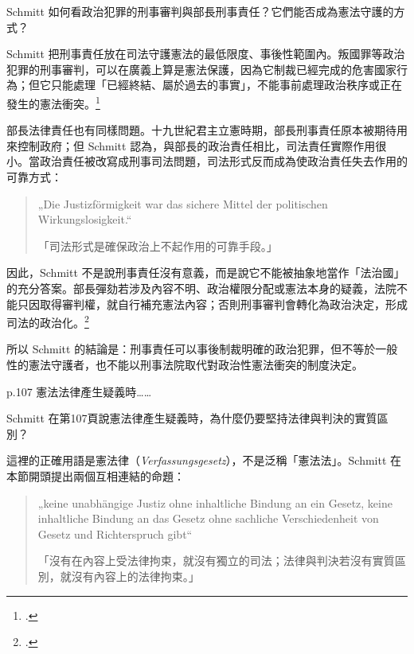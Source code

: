 \begin{qaquestion}
Schmitt 如何看政治犯罪的刑事審判與部長刑事責任？它們能否成為憲法守護的方式？
\end{qaquestion}

Schmitt 把刑事責任放在司法守護憲法的最低限度、事後性範圍內。叛國罪等政治犯罪的刑事審判，可以在廣義上算是憲法保護，因為它制裁已經完成的危害國家行為；但它只能處理「已經終結、屬於過去的事實」，不能事前處理政治秩序或正在發生的憲法衝突。\footcites[95--96]{schmitt2015}[26--27]{schmitt1931}

部長法律責任也有同樣問題。十九世紀君主立憲時期，部長刑事責任原本被期待用來控制政府；但 Schmitt 認為，與部長的政治責任相比，司法責任實際作用很小。當政治責任被改寫成刑事司法問題，司法形式反而成為使政治責任失去作用的可靠方式：

\begin{quote}
„Die Justizförmigkeit war das sichere Mittel der politischen Wirkungslosigkeit.``

「司法形式是確保政治上不起作用的可靠手段。」
\end{quote}

因此，Schmitt 不是說刑事責任沒有意義，而是說它不能被抽象地當作「法治國」的充分答案。部長彈劾若涉及內容不明、政治權限分配或憲法本身的疑義，法院不能只因取得審判權，就自行補充憲法內容；否則刑事審判會轉化為政治決定，形成司法的政治化。\footcites[90--93, 96--99]{schmitt2015}[22--29]{schmitt1931}

所以 Schmitt 的結論是：刑事責任可以事後制裁明確的政治犯罪，但不等於一般性的憲法守護者，也不能以刑事法院取代對政治性憲法衝突的制度決定。


\begin{qaprompt}
p.107 憲法法律產生疑義時\ldots\ldots{}
\end{qaprompt}

\begin{qaquestion}
Schmitt 在第107頁說憲法律產生疑義時，為什麼仍要堅持法律與判決的實質區別？
\end{qaquestion}

這裡的正確用語是憲法律（\emph{Verfassungsgesetz}），不是泛稱「憲法法」。Schmitt 在本節開頭提出兩個互相連結的命題：

\begin{quote}
„keine unabhängige Justiz ohne inhaltliche Bindung an ein Gesetz, keine inhaltliche Bindung an das Gesetz ohne sachliche Verschiedenheit von Gesetz und Richterspruch gibt``

「沒有在內容上受法律拘束，就沒有獨立的司法；法律與判決若沒有實質區別，就沒有內容上的法律拘束。」
\end{quote}

